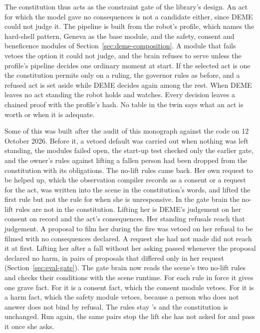 The constitution thus acts as the constraint gate of the library's design.
An act for which the model gave no consequences is not a candidate either, since DEME could not
judge it.
The pipeline is built from the robot's profile, which names the hard-shell pattern, Geneva as the
base module, and the safety, consent and beneficence modules of Section~\ref{sec:deme-composition}.
A module that fails vetoes the option it could not judge, and the brain refuses to serve unless
the profile's pipeline decides one ordinary moment at start.
If the selected act is one the constitution permits only on a ruling, the governor rules as before,
and a refused act is set aside while DEME decides again among the rest.
When DEME leaves no act standing the robot holds and watches.
Every decision leaves a chained proof with the profile's hash.
No table in the twin says what an act is worth or when it is adequate.

Some of this was built after the audit of this monograph against the code on 12 October 2026.
Before it, a vetoed default was carried out when nothing was left standing, the modules failed
open, the start-up test checked only the earlier gate, and the owner's rules against lifting a
fallen person had been dropped from the constitution with its obligations.
The no-lift rules came back.
Her own request to be helped up, which the observation compiler records as a consent or a request
for the act, was written into the scene in the constitution's words, and lifted the first rule but
not the rule for when she is unresponsive.
In the gate brain the no-lift rules are not in the constitution. Lifting her is DEME's judgement on
her consent on record and the act's consequences.
Her standing refusals reach that judgement. A proposal to film her during the fire was vetoed on her
refusal to be filmed with no consequences declared. A request she had not made did not reach it at
first. Lifting her after a fall without her asking passed whenever the proposal declared no harm, in
pairs of proposals that differed only in her request (Section~\ref{sec:eval-gate}).
The gate brain now reads the scene's two no-lift rules and checks their conditions with the scene
runtime. For each rule in force it gives \deme{} one grave fact. For  it is a consent
fact, which the consent module vetoes. For  it is a harm fact, which the safety
module vetoes, because a person who does not answer does not bind by refusal. The rules stay
\deme{}'s and the constitution is unchanged. Run again, the same pairs stop the lift she has not
asked for and pass it once she asks.

